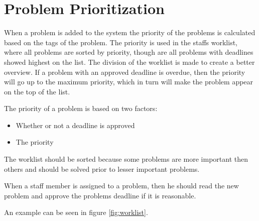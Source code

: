 \section{Problem Prioritization}
\label{sec:problem_priority}

When a problem is added to the system the priority of the problems is calculated based on the tags of the problem. The priority is used in the staffs worklist, where all problems are sorted by priority, though are all problems with deadlines showed highest on the list. The division of the worklist is made to create a better overview. If a problem with an approved deadline is overdue, then the priority will go up to the maximum priority, which in turn will make the problem appear on the top of the list.
 
The priority of a problem is based on two factors:


\begin{itemize}
	\item Whether or not a deadline is approved
	\item The priority
\end{itemize}

The worklist should be sorted because some problems are more important then others and should be solved prior to lesser important problems. 

When a staff member is assigned to a problem, then he should read the new problem and approve the problems deadline if it is reasonable. 



An example can be seen in figure \ref{fig:worklist}.
